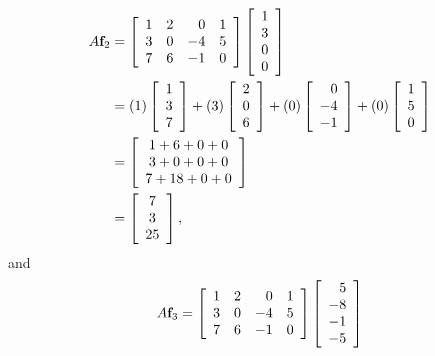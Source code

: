 \begin{example}
\begin{align*}
A\mathbf{f}_2 &= \left[ \begin{array}{ccrc} 1&2&0&1\\3&0&-4&5\\7&6&-1&0 \end{array} \right] \left[ \begin{array}{c} 1\\3\\0\\0 \end{array} \right] \\
	&= (1) \left[ \begin{array}{c} 1\\3\\7 \end{array} \right]  + (3)  \left[ \begin{array}{c} 2\\0\\6 \end{array} \right]  + (0)  \left[ \begin{array}{r} 0\\-4\\-1 \end{array} \right] + (0)  \left[ \begin{array}{c} 1\\5\\0 \end{array} \right] \\
	&=  \left[ \begin{array}{c} 1+6+0+0\\ 3+0+0+0 \\ 7+18+0+0\end{array} \right] \\
	&=  \left[ \begin{array}{c} 7\\3\\25 \end{array} \right],
\end{align*}
and
\begin{align*}
A\vf_3 &= \left[ \begin{array}{ccrc} 1&2&0&1\\3&0&-4&5\\7&6&-1&0 \end{array} \right] \left[ \begin{array}{r} 5\\-8\\-1\\-5 \end{array} \right] \\

\end{align*}
\end{example}
